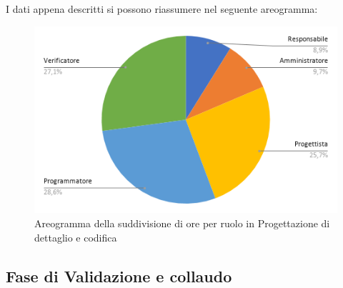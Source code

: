 I dati appena descritti si possono riassumere nel seguente areogramma:
\begin{figure}[!h]
    \vspace{5px}
    \includegraphics[scale=0.5]{../../../Images/Diagrammi/Diagramma a torta/ore codifica.png}
    \centering
    \caption{Areogramma della suddivisione di ore per ruolo in Progettazione di dettaglio e codifica}
\end{figure}



\subsection{Fase di Validazione e collaudo}
